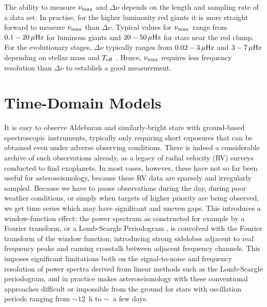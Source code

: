 \documentclass[modern]{aastex61}
\newcommand{\numax}{\mbox{$\nu_{\rm max}$}\xspace}
\newcommand{\Dnu}{\mbox{$\Delta \nu$}\xspace}
\newcommand{\teff}{\mbox{$T_{\rm eff}$}\xspace}
\newcommand{\guy}[1]{{\bf \color{blue} #1}}
\begin{document}
The ability to measure \numax and \Dnu depends on the length and sampling rate of a data set.
In practise, for the higher luminosity red giants it is more straight forward to measure \numax than \Dnu.  Typical values for \numax\ range from $0.1-20 \rm\,\mu Hz$ for luminous giants and $20-50 \rm\,\mu Hz$ for stars near the red clump.  For the evolutionary stages, \Dnu typically ranges from $0.02-3 \rm\,\mu Hz$ and $3-7 \rm\,\mu Hz$ depending on stellar mass and \teff
\citep[e.g.,][]{2011A&A...525L...9M, 2013A&A...559A.137M}.  Hence, \numax requires less frequency resolution than \Dnu to establish a good measurement.


\section{Time-Domain Models}

It is easy to observe Aldebaran and similarly-bright stars with ground-based spectroscopic instruments, typically only requiring short exposures that can be obtained even under adverse observing conditions. There is indeed a considerable archive of such observations already, as a legacy of radial velocity (RV) surveys conducted to find exoplanets. In most cases, however, these have not so far been useful for asteroseismology, because these RV data are sparsely and irregularly sampled. Because we have to pause observations during the day, during poor weather conditions, or simply when targets of higher priority are being observed, we get time series which may have significant and uneven gaps. This introduces a window-function effect: the power spectrum as constructed for example by a Fourier transform, or a Lomb-Scargle Periodogram \citep{lomb,scargle}, is convolved with the Fourier transform of the window function, introducing strong sidelobes adjacent to real frequency peaks and causing crosstalk between adjacent frequency channels. This imposes significant limitations both on the signal-to-noise and frequency resolution of power spectra derived from linear methods such as the Lomb-Scargle periodogram, and in practice makes asteroseismology with these conventional approaches difficult or impossible from the ground for stars with oscillation periods ranging from $\sim 12$~h to $\sim$~a few days.
\end{document}
